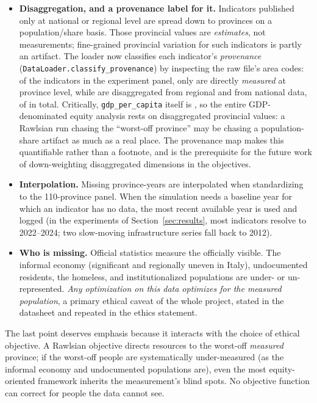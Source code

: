 \documentclass[11pt,a4paper]{article}
\newcommand{\code}[1]{\texttt{#1}}
\begin{document}
\begin{itemize}
    \item \textbf{Disaggregation, and a provenance label for it.} Indicators
    published only at national or regional level are spread down to provinces on
    a population/share basis. Those provincial values are \emph{estimates}, not
    measurements; fine-grained provincial variation for such indicators is
    partly an artifact. The loader now classifies each indicator's
    \emph{provenance} (\code{DataLoader.classify\_provenance}) by inspecting the
    raw file's area codes: of the \provTotal{} indicators in the experiment
    panel, only \provMeasured{} are directly \emph{measured} at province level,
    while \provDisaggRegional{} are disaggregated from regional and
    \provDisaggNational{} from national data, \provDisaggTotal{} of
    \provTotal{} in total. Critically, \code{gdp\_per\_capita} itself is
    \provGdp{}, so the entire GDP-denominated equity analysis rests on
    disaggregated provincial values: a Rawlsian run chasing the ``worst-off
    province'' may be chasing a population-share artifact as much as a real
    place. The provenance map makes this quantifiable rather than a footnote,
    and is the prerequisite for the future work of down-weighting disaggregated
    dimensions in the objectives.
    \item \textbf{Interpolation.} Missing province-years are interpolated when
    standardizing to the 110-province panel. When the simulation needs a
    baseline year for which an indicator has no data, the most recent available
    year is used and logged (in the experiments of Section~\ref{sec:results},
    most indicators resolve to 2022--2024; two slow-moving infrastructure
    series fall back to 2012).
    \item \textbf{Who is missing.} Official statistics measure the officially
    visible. The informal economy (significant and regionally uneven in Italy),
    undocumented residents, the homeless, and institutionalized populations are
    under- or un-represented. \emph{Any optimization on this data optimizes for
    the measured population}, a primary ethical caveat of the whole project,
    stated in the datasheet and repeated in the ethics statement.
\end{itemize}

The last point deserves emphasis because it interacts with the choice of
ethical objective. A Rawlsian objective directs resources to the worst-off
\emph{measured} province; if the worst-off people are systematically
under-measured (as the informal economy and undocumented populations are), even
the most equity-oriented framework inherits the measurement's blind spots. No
objective function can correct for people the data cannot see.
\end{document}
